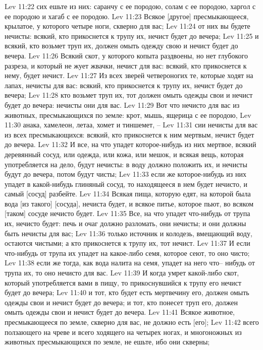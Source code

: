 Lev 11:22  сих ешьте из них: саранчу с ее породою, солам с ее породою, харгол с ее породою и хагаб с ее породою.
Lev 11:23  Всякое [другое] пресмыкающееся, крылатое, у которого четыре ноги, скверно для вас;
Lev 11:24  от них вы будете нечисты: всякий, кто прикоснется к трупу их, нечист будет до вечера;
Lev 11:25  и всякий, кто возьмет труп их, должен омыть одежду свою и нечист будет до вечера.
Lev 11:26  Всякий скот, у которого копыта раздвоены, но нет глубокого разреза, и который не жует жвачки, нечист для вас: всякий, кто прикоснется к нему, будет нечист.
Lev 11:27  Из всех зверей четвероногих те, которые ходят на лапах, нечисты для вас: всякий, кто прикоснется к трупу их, нечист будет до вечера;
Lev 11:28  кто возьмет труп их, тот должен омыть одежды свои и нечист будет до вечера: нечисты они для вас.
Lev 11:29  Вот что нечисто для вас из животных, пресмыкающихся по земле: крот, мышь, ящерица с ее породою,
Lev 11:30  анака, хамелеон, летаа, хомет и тиншемет, --
Lev 11:31  сии нечисты для вас из всех пресмыкающихся: всякий, кто прикоснется к ним мертвым, нечист будет до вечера.
Lev 11:32  И все, на что упадет которое-нибудь из них мертвое, всякий деревянный сосуд, или одежда, или кожа, или мешок, и всякая вещь, которая употребляется на дело, будут нечисты: в воду должно положить их, и нечисты будут до вечера, потом будут чисты;
Lev 11:33  если же которое-нибудь из них упадет в какой-нибудь глиняный сосуд, то находящееся в нем будет нечисто, и самый [сосуд] разбейте.
Lev 11:34  Всякая пища, которую едят, на которой была вода [из такого] [сосуда], нечиста будет, и всякое питье, которое пьют, во всяком [таком] сосуде нечисто будет.
Lev 11:35  Все, на что упадет что-нибудь от трупа их, нечисто будет: печь и очаг должно разломать, они нечисты; и они должны быть нечисты для вас;
Lev 11:36  только источник и колодезь, вмещающий воду, остаются чистыми; а кто прикоснется к трупу их, тот нечист.
Lev 11:37  И если что-нибудь от трупа их упадет на какое-либо семя, которое сеют, то оно чисто;
Lev 11:38  если же тогда, как вода налита на семя, упадет на него что-- нибудь от трупа их, то оно нечисто для вас.
Lev 11:39  И когда умрет какой-либо скот, который употребляется вами в пищу, то прикоснувшийся к трупу его нечист будет до вечера;
Lev 11:40  и тот, кто будет есть мертвечину его, должен омыть одежды свои и нечист будет до вечера; и тот, кто понесет труп его, должен омыть одежды свои и нечист будет до вечера.
Lev 11:41  Всякое животное, пресмыкающееся по земле, скверно для вас, не должно есть [его];
Lev 11:42  всего ползающего на чреве и всего ходящего на четырех ногах, и многоножных из животных пресмыкающихся по земле, не ешьте, ибо они скверны;
